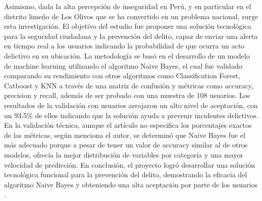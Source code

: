 \documentclass[runningheads]{llncs}
\begin{document}
Asimismo, dada la alta percepción de inseguridad en Perú, y en particular en el
distrito limeño de Los Olivos que se ha convertido en un problema nacional,
surge esta investigación. El objetivo del estudio fue proponer una solución
tecnológica para la seguridad ciudadana y la prevención del delito, capaz de
enviar una alerta en tiempo real a los usuarios indicando la probabilidad de
que ocurra un acto delictivo en su ubicación. La metodología se basó en el
desarrollo de un modelo de machine learning utilizando el algoritmo Naive
Bayes, el cual fue validado comparando su rendimiento con otros algoritmos como
Classification Forest, Catboost y KNN a través de una matriz de confusión y
métricas como accuracy, precision y recall, además de ser probado con una
muestra de 108 usuarios. Los resultados de la validación con usuarios arrojaron
un alto nivel de aceptación, con un 93.5\% de ellos indicando que la solución
ayuda a prevenir incidentes delictivos. En la validación técnica, aunque el
artículo no especifica los porcentajes exactos de las métricas, según menciona
el autor, se determinó que Naive Bayes fue el más adecuado porque a pesar de
tener un valor de accuracy similar al de otros modelos, ofrecía la mejor
distribución de variables por categoría y una mayor velocidad de predicción. En
conclusión, el proyecto logró desarrollar una solución tecnológica funcional
para la prevención del delito, demostrando la eficacia del algoritmo Naive
Bayes y obteniendo una alta aceptación por parte de los usuarios
\cite{mansilla2023}.



\end{document}
